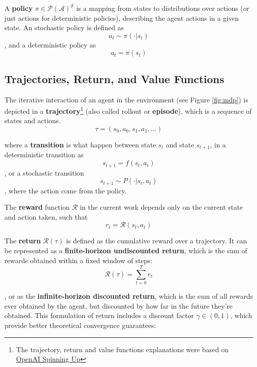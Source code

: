 
A \textbf{policy} $\pi \in \mathcal{P}(\mathcal{A})^\mathcal{S}$ is a mapping from states to distributions over actions (or just actions for deterministic policies), describing the agent actions in a given state. An stochastic policy is defined as
\begin{equation}
    a_t \sim \pi(\cdot|s_t)
\end{equation}
, and a deterministic policy as 
\begin{equation}
a_t = \pi(s_t)    
\end{equation} 

\subsection{Trajectories, Return, and Value Functions}

The iterative interaction of an agent in the environment (see Figure \ref{fig:mdp}) is depicted in a \textbf{trajectory}\footnote{The trajectory, return and value functions explanations were based on \href{https://spinningup.openai.com/en/latest/spinningup/rl_intro.html}{OpenAI Spinning Up}} (also called rollout or \textbf{episode}), which is a sequence of states and actions.
$$\tau = (s_0, a_0, s_1, a_1, \dots )$$

where a \textbf{transition} is what happen between state $s_t$ and state $s_{t+1}$, in a deterministic transition as 
$$s_{t+1} = f(s_t, a_t)$$, 
or a stochastic transition $$s_{t+1} \sim P(\cdot | s_t, a_t)$$, where the action come from the policy.

The \textbf{reward} function $\mathcal{R}$ in the current work depends only on the current state and action taken, such that
$$r_t = \mathcal{R}(s_t,a_t)$$

The \textbf{return} $\mathcal{R}(\tau)$ is defined as the cumulative reward over a trajectory. It can be represented as a \textbf{finite-horizon undiscounted return}, which is the sum of rewards obtained within a fixed window of steps:
$$\mathcal{R}(\tau) = \sum_{t=0}^T r_t$$

, or as the \textbf{infinite-horizon discounted return}, which is the sum of all rewards ever obtained by the agent, but discounted by how far in the future they’re obtained. This formulation of return includes a discount factor $\gamma \in (0,1)$, which provide better theoretical convergence guarantees:

